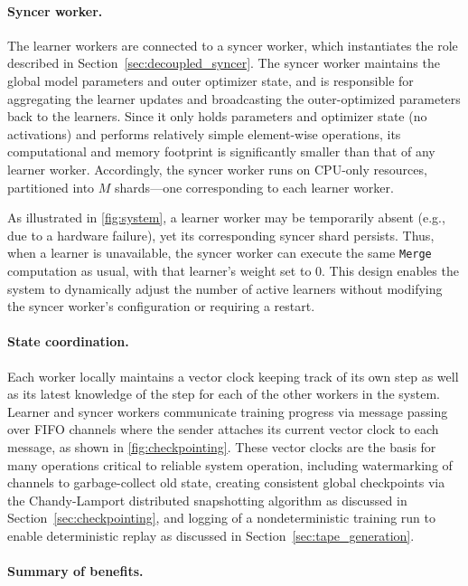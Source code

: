 \documentclass[11pt, a4paper, twocolumn, copyright, google]{google}
\begin{document}
\paragraph{Syncer worker.}
The learner workers are connected to a syncer worker, which instantiates the role described in Section~\ref{sec:decoupled_syncer}. The syncer worker maintains the global model parameters and outer optimizer state, and is responsible for aggregating the learner updates and broadcasting the outer-optimized parameters back to the learners. Since it only holds parameters and optimizer state (no activations) and performs relatively simple element-wise operations, its computational and memory footprint is significantly smaller than that of any learner worker. Accordingly, the syncer worker runs on CPU-only resources, partitioned into $M$ shards---one corresponding to each learner worker.

As illustrated in \autoref{fig:system}, a learner worker may be temporarily absent (e.g., due to a hardware failure), yet its corresponding syncer shard persists. Thus, when a learner is unavailable, the syncer worker can execute the same \texttt{Merge} computation as usual, with that learner's weight set to 0. This design enables the system to dynamically adjust the number of active learners without modifying the syncer worker's configuration or requiring a restart.

\paragraph{State coordination.}
Each worker locally maintains a vector clock \citep{mattern1989virtual} keeping track of its own step as well as its latest knowledge of the step for each of the other workers in the system. Learner and syncer workers communicate training progress via message passing over FIFO channels where the sender attaches its current vector clock to each message, as shown in \autoref{fig:checkpointing}. These vector clocks are the basis for many operations critical to reliable system operation, including watermarking of channels to garbage-collect old state, creating consistent global checkpoints via the Chandy-Lamport distributed snapshotting algorithm \citep{chandy1985distributed} as discussed in Section~\ref{sec:checkpointing}, and logging of a nondeterministic training run to enable deterministic replay as discussed in Section~\ref{sec:tape_generation}.

\paragraph{Summary of benefits.}
\end{document}
